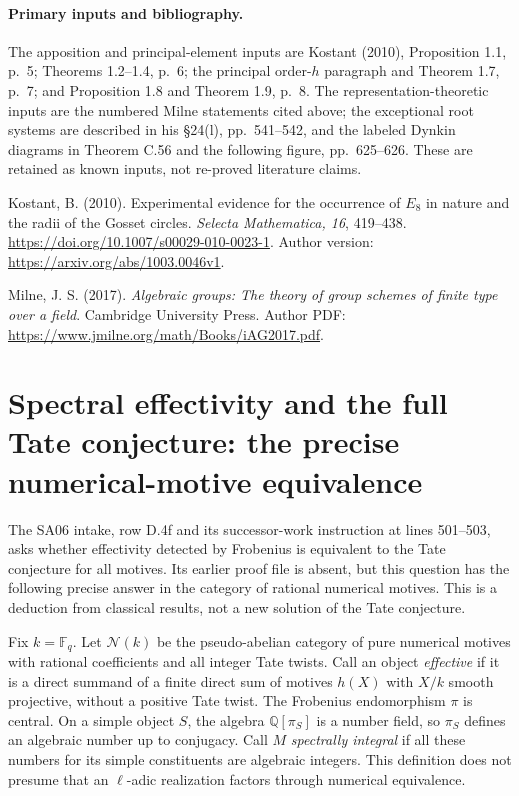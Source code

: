\documentclass[11pt,a4paper]{article}
\theoremstyle{definition}\newtheorem{definition}[theorem]{Definition}
\theoremstyle{remark}\newtheorem{remark}[theorem]{Remark}
\begin{document}
\paragraph{Primary inputs and bibliography.}
The apposition and principal-element inputs are Kostant (2010),
Proposition 1.1, p.~5; Theorems 1.2--1.4, p.~6; the principal
order-\(h\) paragraph and Theorem 1.7, p.~7; and
Proposition 1.8 and Theorem 1.9, p.~8.
The representation-theoretic inputs are the numbered Milne
statements cited above; the exceptional root systems are described
in his \S24(l), pp.~541--542, and the labeled Dynkin diagrams in
Theorem C.56 and the following figure, pp.~625--626. These are retained as known
inputs, not re-proved literature claims.

Kostant, B. (2010). Experimental evidence for the occurrence of
\(E_8\) in nature and the radii of the Gosset circles.
\emph{Selecta Mathematica, 16}, 419--438.
\url{https://doi.org/10.1007/s00029-010-0023-1}.
Author version:
\url{https://arxiv.org/abs/1003.0046v1}.

Milne, J. S. (2017). \emph{Algebraic groups: The theory of group
schemes of finite type over a field}. Cambridge University Press.
Author PDF: \url{https://www.jmilne.org/math/Books/iAG2017.pdf}.


\section{Spectral effectivity and the full Tate conjecture: the precise numerical-motive equivalence}

The SA06 intake, row D.4f and its successor-work instruction at
lines 501--503, asks whether effectivity detected by Frobenius is
equivalent to the Tate conjecture for all motives.  Its earlier proof
file is absent, but this question has the following precise answer in
the category of rational numerical motives.  This is a deduction from
classical results, not a new solution of the Tate conjecture.

Fix $k=\mathbb F_q$.  Let $\mathcal N(k)$ be the pseudo-abelian
category of pure numerical motives with rational coefficients and all
integer Tate twists.  Call an object \emph{effective} if it is a
direct summand of a finite direct sum of motives $h(X)$ with $X/k$
smooth projective, without a positive Tate twist.  The Frobenius
endomorphism $\pi$ is central.  On a simple object $S$, the algebra
$\mathbb Q[\pi_S]$ is a number field, so $\pi_S$ defines an algebraic
number up to conjugacy.  Call $M$ \emph{spectrally integral} if all
these numbers for its simple constituents are algebraic integers.
This definition does not presume that an $\ell$-adic realization
factors through numerical equivalence.
\end{document}
